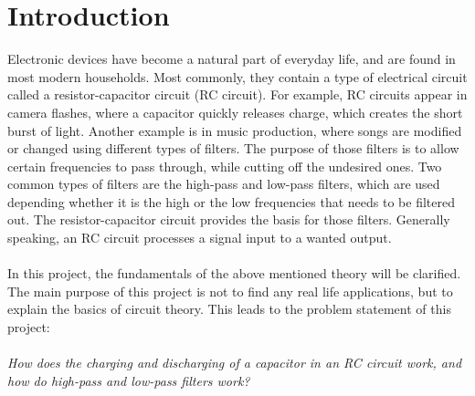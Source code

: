 \chapter{Introduction}
Electronic devices have become a natural part of everyday life, and are found in most modern households. Most commonly, they contain a type of electrical circuit called a resistor-capacitor circuit (RC circuit). For example, RC circuits appear in camera flashes, where a capacitor quickly releases charge, which creates the short burst of light. Another example is in music production, where songs are modified or changed using different types of filters. The purpose of those filters is to allow certain frequencies to pass through, while cutting off the undesired ones. Two common types of filters are the high-pass and low-pass filters, which are used depending whether it is the high or the low frequencies that needs to be filtered out. The resistor-capacitor circuit provides the basis for those filters. Generally speaking, an RC circuit processes a signal input to a wanted output. 
\\ \\
In this project, the fundamentals of the above mentioned theory will be clarified. The main purpose of this project is not to find any real life applications, but to explain the basics of circuit theory. This leads to the problem statement of this project:
\\ \\
\textit{How does the charging and discharging of a capacitor in an RC circuit work, and how do high-pass and low-pass filters work?}

